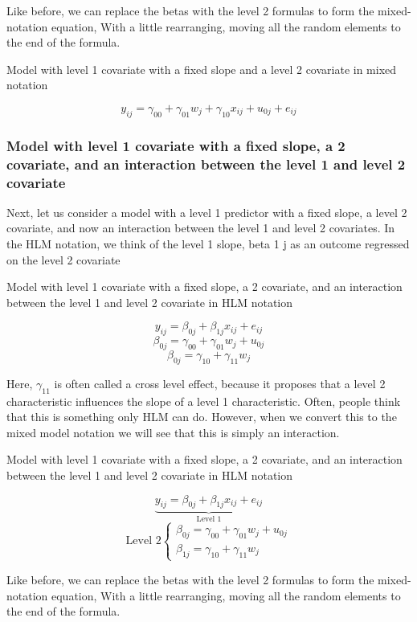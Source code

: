 Like before, we can replace the betas with the level 2 formulas to form the mixed-notation equation, With a little rearranging, moving all the random elements to the end of the formula.

Model with level 1 covariate with a fixed slope and a level 2 covariate in mixed notation

\[
y_{ij} = \gamma_{00}+\gamma_{01}w_j+\gamma_{10}x_{ij}+u_{0j}+e_{ij}
\]

\subsubsection{Model with level 1 covariate with a fixed slope, a 2 covariate, and an interaction between the level 1 and level 2 covariate}

Next, let us consider a model with a level 1 predictor with a fixed slope, a level 2 covariate, and now an interaction between the level 1 and level 2 covariates. In the HLM notation, we think of the level 1 slope, beta 1 j as an outcome regressed on the level 2 covariate

Model with level 1 covariate with a fixed slope, a 2 covariate, and an interaction between the level 1 and level 2 covariate in HLM notation

\[
y_{ij} = \beta_{0j}+\beta_{1j}x_{ij}+e_{ij}
\]
\[
\beta_{0j} = \gamma_{00}+\gamma_{01}w_j+u_{0j}
\]
\[
\beta_{0j} = \gamma_{10}+\gamma_{11}w_j
\]

Here, $\gamma_{11}$ is often called a cross level effect, because it proposes that a level 2 characteristic influences the slope of a level 1 characteristic. Often, people think that this is something only HLM can do. However, when we convert this to the mixed model notation we will see that this is simply an interaction.

Model with level 1 covariate with a fixed slope, a 2 covariate, and an interaction between the level 1 and level 2 covariate in HLM notation

\[
\underbrace{y_{ij} = \beta_{0j}+\beta_{1j}x_{ij}+e_{ij}}_{\text{Level 1}}
\]
\[
\mbox{Level 2}
\begin{cases}
    \beta_{0j} = \gamma_{00}+\gamma_{01}w_j+u_{0j}  \\
    \beta_{1j} = \gamma_{10}+\gamma_{11}w_j
\end{cases}
\]

Like before, we can replace the betas with the level 2 formulas to form the mixed-notation equation, With a little rearranging, moving all the random elements to the end of the formula.


